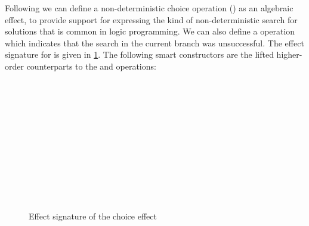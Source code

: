Following \cite{DBLP:conf/ppdp/SchrijversWDD14,WuSH14,YangPWBS22} we can define a non-deterministic choice operation () as an algebraic effect, to provide support for expressing the kind of non-deterministic search for solutions that is common in logic programming.
We can also define a  operation which indicates that the search in the current branch was unsuccessful.
The effect signature for  is given in \cref{fig:choice-sig}.
The following smart constructors are the lifted higher-order counterparts to the  and  operations:
\begin{code}[hide]%
\>[0][@{}l@{\AgdaIndent{1}}]%
\>[2]\AgdaSpace{}%
\AgdaSpace{}%
\<%
\\
\>[2][@{}l@{\AgdaIndent{0}}]%
\>[4]\AgdaSpace{}%
\<%
\\
%
\>[4]\AgdaSpace{}%
\<%
\\
%
\>[4]\AgdaSpace{}%
\<%
\\
\>[0]\<%
\end{code}
\begin{figure}
\begin{minipage}{0.495\linewidth}
\begin{code}%
\>[0][@{}l@{\AgdaIndent{1}}]%
\>[4]\AgdaSpace{}%
\AgdaSpace{}%
\AgdaSymbol{:}\AgdaSpace{}%
\AgdaSpace{}%
\<%
\\
\>[4][@{}l@{\AgdaIndent{0}}]%
\>[6]%
\>[12]\AgdaSymbol{:}\AgdaSpace{}%
\<%
\\
%
\>[6]%
\>[12]\AgdaSymbol{:}\AgdaSpace{}%
\<%
\end{code}
  \end{minipage}
  \hfill\vline\hfill
  \begin{minipage}{0.495\linewidth}
\begin{code}%
%
\>[4]\AgdaSpace{}%
\AgdaSymbol{:}\AgdaSpace{}%
\<%
\\
%
\>[4]%
\>[8]\AgdaSpace{}%
\AgdaSymbol{=}\AgdaSpace{}%
\<%
\\
%
\>[4]\AgdaSpace{}%
\AgdaSpace{}%
\AgdaSpace{}%
\AgdaSymbol{=}\AgdaSpace{}%
\<%
\\
%
\>[4]\AgdaSpace{}%
\AgdaSpace{}%
\AgdaSpace{}%
\AgdaSymbol{=}\AgdaSpace{}%
\<%
\end{code}
\end{minipage}
\caption{Effect signature of the choice effect}
\label{fig:choice-sig}
\end{figure}

